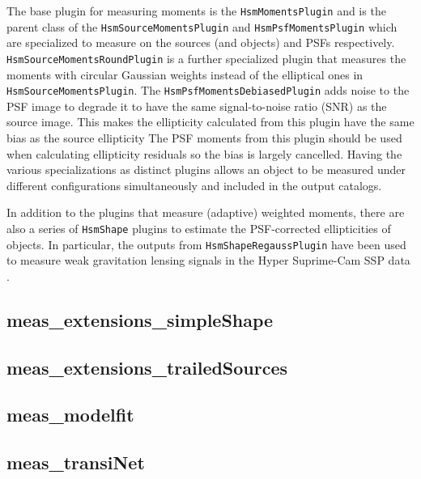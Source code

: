 The base plugin for measuring moments is the \texttt{HsmMomentsPlugin} and is the parent class of the \texttt{HsmSourceMomentsPlugin} and \texttt{HsmPsfMomentsPlugin} which are specialized to measure on the sources (and objects) and PSFs respectively.
\texttt{HsmSourceMomentsRoundPlugin} is a further specialized plugin that measures the moments with circular Gaussian weights instead of the elliptical ones in \texttt{HsmSourceMomentsPlugin}.
The \texttt{HsmPsfMomentsDebiasedPlugin} adds noise to the PSF image to degrade it to have the same signal-to-noise ratio (SNR) as the source image.
This makes the ellipticity calculated from this plugin have the same bias as the source ellipticity
The PSF moments from this plugin should be used when calculating ellipticity residuals so the bias is largely cancelled.
Having the various specializations as distinct plugins allows an object to be measured under different configurations simultaneously and included in the output catalogs.

In addition to the plugins that measure (adaptive) weighted moments, there are also a series of \texttt{HsmShape} plugins to estimate the PSF-corrected ellipticities of objects.
In particular, the outputs from \texttt{HsmShapeRegaussPlugin} have been used to measure weak gravitation lensing signals in the Hyper Suprime-Cam SSP data \citep{2018PASJ...70S..25M, 2022PASJ...74..421L}.
\subsection{meas\_extensions\_simpleShape}
\subsection{meas\_extensions\_trailedSources}
\subsection{meas\_modelfit}
\subsection{meas\_transiNet}
